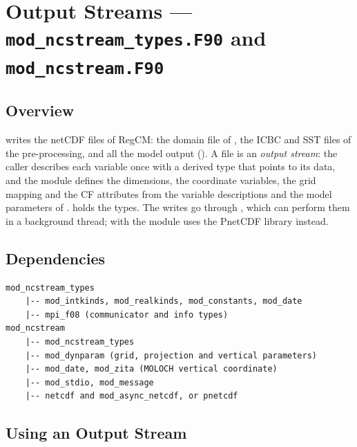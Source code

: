 \section{Output Streams --- \texttt{mod\_ncstream\_types.F90} and
         \texttt{mod\_ncstream.F90}}
\label{sec:ncstream}

\subsection{Overview}

 writes the netCDF files of RegCM: the domain file of
, the ICBC and SST files of the pre-processing, and all the
model output (). A file is an \emph{output stream}: the
caller describes each variable once with a derived type that points to its
data, and the module defines the dimensions, the coordinate variables, the
grid mapping and the CF attributes from the variable descriptions and the
model parameters of .  holds
the types. The writes go through , which can
perform them in a background thread; with  the module uses
the PnetCDF library instead.

\subsection{Dependencies}

\begin{lstlisting}
mod_ncstream_types
    |-- mod_intkinds, mod_realkinds, mod_constants, mod_date
    |-- mpi_f08 (communicator and info types)
mod_ncstream
    |-- mod_ncstream_types
    |-- mod_dynparam (grid, projection and vertical parameters)
    |-- mod_date, mod_zita (MOLOCH vertical coordinate)
    |-- mod_stdio, mod_message
    |-- netcdf and mod_async_netcdf, or pnetcdf
\end{lstlisting}

\subsection{Using an Output Stream}

